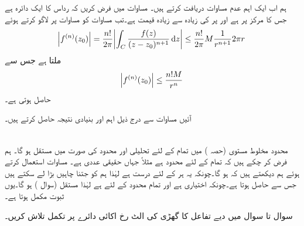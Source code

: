 ہم اب ایک اہم عدم مساوات دریافت کرتے ہیں۔ مساوات  میں فرض کریں کہ  رداس  کا ایک دائرہ ہے جس کا مرکز  پر ہے اور  پر  کی زیادہ سے زیادہ قیمت  ہے۔تب مساوات  کو مساوات  پر لاگو کرتے ہوئے
\begin{align*}
\abs{f^{(n)}(z_0)}=\frac{n!}{2\pi} \abs{\int_C \frac{f(z)}{(z-z_0)^{n+1}}\dif z}\le \frac{n!}{2\pi}M\frac{1}{r^{n+1}}2\pi r
\end{align*}
ملتا ہے جس سے  
\begin{align}\label{مساوات_مخلوط_تکمل_کوشی_عدم_مساوات}
\abs{f^{(n)}(z_0)}\le \frac{n!M}{r^n}
\end{align}
حاصل ہوتی ہے۔

آئیں مساوات  سے درج ذیل اہم اور بنیادی نتیجہ حاصل کرتے ہیں۔

\quad {}\\
محدود مخلوط مستوی (حصہ ) میں تمام  کے لئے تحلیلی  اور محدود  کی صورت میں  مستقل ہو گا۔
\quad
ہم فرض کر چکے ہیں کہ تمام  کے لئے   محدود ہے مثلاً  جہاں  حقیقی عددی ہے۔ مساوات  استعمال کرتے ہوئے ہم دیکھتے ہیں کہ  ہو گا۔چونکہ یہ ہر  کے لئے درست ہے لہٰذا ہم  کو جتنا چاہیں بڑا لے سکتے ہیں جس سے  حاصل ہوتا ہے۔چونکہ  اختیاری ہے اور تمام محدود  کے لئے  ہے لہٰذا  مستقل (سوال ) ہو گا۔یوں ثبوت مکمل ہوتا ہے۔

سوال  تا سوال  میں دیے  تفاعل کا گھڑی کی الٹ رخ اکائی دائرے پر تکمل تلاش کریں۔

